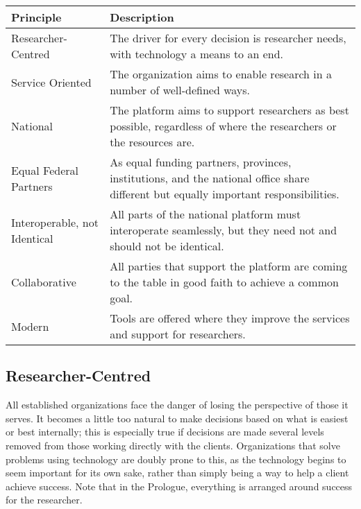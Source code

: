 \documentclass[11pt, letterpaper, twoside]{article}
\begin{document}
\begin{table}[ht]
\centering
\small {\sffamily
{}
\begin{tabular}{l|P{3.5in}}
\textcolor{cdaRed}{\textbf{Principle}} & \textcolor{cdaRed}{\textbf{Description}} \\
\hline
\hline
Researcher-Centred & The driver for every decision is researcher needs, with technology a means to an end. \\
Service Oriented & The organization aims to enable research in a number of well-defined ways. \\
National & The platform aims to support researchers as best possible, regardless of where the researchers or the resources are. \\
Equal Federal Partners & As equal funding partners, provinces, institutions, and the national office share different but equally important responsibilities. \\
Interoperable, not Identical & All parts of the national platform must interoperate seamlessly, but they need not and should not be identical. \\
Collaborative & All parties that support the platform are coming to the table in good faith to achieve a common goal. \\
Modern & Tools are offered where they improve the services and support for researchers. \\
\hline
\end{tabular}
}
\end{table}

\subsection*{Researcher-Centred}
%


All established organizations face the danger of losing the perspective
of those it serves. It becomes a little too natural to make decisions
based on what is easiest or best internally; this is especially true if
decisions are made several levels removed from those working directly
with the clients. Organizations that solve problems using technology are
doubly prone to this, as the technology begins to seem important for its
own sake, rather than simply being a way to help a client achieve
success. Note that in the Prologue, everything is arranged around
success for the researcher.
\end{document}
